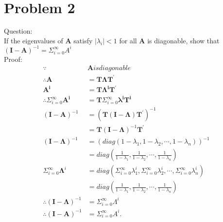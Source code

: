 \documentclass{article}
\begin{document}
\section{Problem 2}
Question:\\ 
If the eigenvalues of $\bm{A}$ satisfy $|\lambda_i|<1$ for all
$\bm{A}$ is diagonable, show that $(\bm{I-A})^{-1}=\Sigma_{i=0}^{\infty}A^i$\\
Proof:\\
   \begin{align*}
     \because &\bm{A} is diagonable\\
     \therefore \bm{A}&=\bm{T\Lambda T^{\prime}}\\
     \bm{A^i}&=\bm{T\Lambda^i T^{\prime}}\\
     \therefore \Sigma_{i=0}^{\infty}\bm{A^i}&=\bm{T}\Sigma_{i=0}^{\infty}\bm{\lambda^i}\bm{T^{i}}\\
     (\bm{I}-\bm{A})^{-1}&=(\bm{T}(\bm{I}-\bm{\Lambda})\bm{T^{\prime}})^{-1}\\
     &=\bm{T}(\bm{I}-\bm{\Lambda})^{-1}\bm{T^{\prime}}\\
     (\bm{I}-\bm{\Lambda})^{-1}&=(diag(1-\lambda_{1},1-\lambda_{2}, \cdots, 1-\lambda_{n}))^{-1}\\
     &=diag(\frac{1}{1-\lambda_{1}},\frac{1}{1-\lambda_{2}}, \cdots, \frac{1}{1-\lambda_{n}})\\
     \Sigma_{i=0}^{\infty}\bm{\Lambda}^{i}&=diag(\Sigma_{i=0}^{\infty}\lambda_{1}^{i},\Sigma_{i=0}^{\infty}\lambda_{2}^{i},
     \cdots, \Sigma_{i=0}^{\infty}\lambda_{n}^{i})\\
     &=diag(\frac{1}{1-\lambda_{1}},\frac{1}{1-\lambda_{2}}, \cdots, \frac{1}{1-\lambda_{n}})\\
     \therefore (\bm{I-\Lambda})^{-1}&=\Sigma_{i=0}^{\infty}\Lambda^i\\
     \therefore (\bm{I-A})^{-1}&=\Sigma_{i=0}^{\infty}A^i
     .
     \end{align*}
     
          
\end{document}
